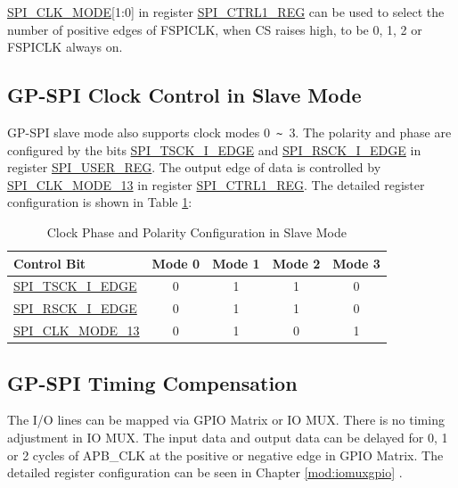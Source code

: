 \documentclass[main\_\_EN.tex]{subfiles}
\begin{document}
\hyperref[fielddesc:SPICLKMODE]{SPI\_CLK\_MODE}[1:0] in register \hyperref[regdesc:SPICTRL1REG]{SPI\_CTRL1\_REG} can be used to select the number of positive edges of FSPICLK, when CS raises high, to be 0, 1, 2 or FSPICLK always on.

\subsection{GP-SPI Clock Control in Slave Mode}\label{GP-SPI2 slave clock control}

GP-SPI slave mode also supports clock modes 0\verb+ ~ +3. The polarity and phase are configured by the bits \hyperref[fielddesc:SPITSCKIEDGE]{SPI\_TSCK\_I\_EDGE} and \hyperref[fielddesc:SPIRSCKIEDGE]{SPI\_RSCK\_I\_EDGE} in register \hyperref[regdesc:SPIUSERREG]{SPI\_USER\_REG}. The output edge of data is controlled by \hyperref[fielddesc:SPICLKMODE13]{SPI\_CLK\_MODE\_13} in register \hyperref[regdesc:SPICTRL1REG]{SPI\_CTRL1\_REG}. The detailed register configuration is shown in Table \ref{table:spi-clock_pol_slave}:

\begin{table}[H]
    \centering
    \caption{Clock Phase and Polarity Configuration in Slave Mode}
    \label{table:spi-clock_pol_slave}
    \begin{tabular}[c]{|p{3.5cm}|c|c|c|c|}
    \hline
    \rowcolor{lightgray}
    Control Bit & Mode 0 & Mode 1 & Mode 2 & Mode 3\\
    \hline
    \hyperref[fielddesc:SPITSCKIEDGE]{SPI\_TSCK\_I\_EDGE}   & 0 & 1 & 1 & 0\\
    \hline
    \hyperref[fielddesc:SPIRSCKIEDGE]{SPI\_RSCK\_I\_EDGE}   & 0 & 1 & 1 & 0\\
    \hline
    \hyperref[fielddesc:SPICLKMODE13]{SPI\_CLK\_MODE\_13}     & 0 & 1 & 0 & 1\\
    \hline
    \end{tabular}
\end{table}


\subsection{GP-SPI Timing Compensation} \label{GP-SPI Timing Compensation}

The I/O lines can be mapped via GPIO Matrix or IO MUX. There is no timing adjustment in IO MUX. The input data and output data can be delayed for 0, 1 or 2 cycles of APB\_CLK at the positive or negative edge in GPIO Matrix. The detailed register configuration can be seen in Chapter \ref{mod:iomuxgpio} \textit{}.
\end{document}
